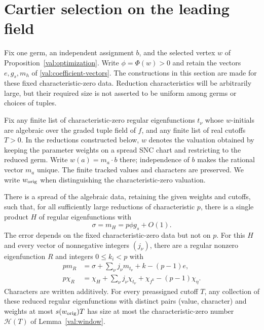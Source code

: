 \section{Cartier selection on the leading field}
\label{sec:cartier}

Fix one germ, an independent assignment $b$, and the selected vertex
$w$ of Proposition~\ref{val:optimization}. Write
$\phi=\Phi(w)>0$ and retain the vectors $e,g_s,m_h$ of
\eqref{val:coefficient-vectors}. The constructions in this section
are made for these fixed characteristic-zero data. Reduction
characteristics will be arbitrarily large, but their required size
is not asserted to be uniform among germs or choices of tuples.

Fix any finite list of characteristic-zero regular eigenfunctions
$t_\nu$ whose $w$-initials are algebraic over the graded tuple
field of $f$, and any finite list of real cutoffs $T>0$.
In the reductions constructed below, $w$ denotes the valuation
obtained by keeping the parameter weights on a spread SNC chart
and restricting to the reduced germ. Write $w(a)=m_a\cdot b$
there; independence of $b$ makes the rational vector $m_a$ unique.
The finite tracked values and characters are preserved. We write
$w_{\rm orig}$ when distinguishing the characteristic-zero valuation.

\begin{proposition}\label{car:output}
There is a spread of the algebraic data, retaining the given weights
and cutoffs, such that, for all sufficiently large reductions of
characteristic $p$, there is a single product
$H$ of regular eigenfunctions with
\[
 \sigma=m_H=p\phi g_s+O(1).
\]
The error depends on the fixed characteristic-zero data but not on
$p$. For this $H$ and every vector of nonnegative integers
$(j_\nu)$, there are a regular nonzero eigenfunction $R$ and
integers $0\le k_i<p$ with
\begin{align}
 p m_R&=\sigma+\sum_\nu j_\nu m_{t_\nu}+k-(p-1)e,
 \label{car:C2-value}\\
 p\chi_R&=\chi_H+\sum_\nu j_\nu\chi_{t_\nu}
                   +\chi_{f^k}-(p-1)\chi_\eta.
 \label{car:C2-character}
\end{align}
Characters are written additively. For every preassigned cutoff
$T$, any collection of these reduced regular eigenfunctions
with distinct pairs \textup{(value, character)} and weights at
most $s(w_{\rm orig})T$ has size at most the characteristic-zero
number $\mathcal H(T)$ of Lemma~\ref{val:window}.
\end{proposition}

